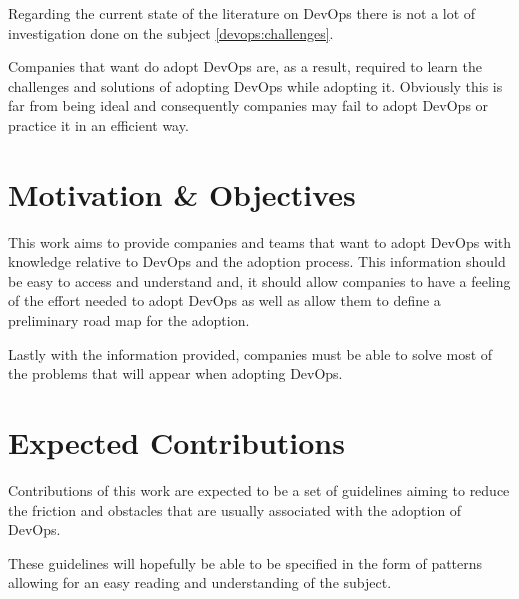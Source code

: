 		Regarding the current state of the literature on DevOps there is not a lot of investigation done on the subject \ref{devops:challenges}. 

		Companies that want do adopt DevOps are, as a result, required to learn the challenges and solutions of adopting DevOps while adopting it. Obviously this is far from being ideal and consequently companies may fail to adopt DevOps or practice it in an efficient way.

		   
	\section{Motivation \& Objectives} \label{chap:introduction:sec:motivation}

	    This work aims to provide companies and teams that want to adopt DevOps with knowledge relative to DevOps and the adoption process. This information should be easy to access and understand and, it should allow companies to have a feeling of the effort needed to adopt DevOps as well as allow them to define a preliminary road map for the adoption. 
	    
	    Lastly with the information provided, companies must be able to solve most of the problems that will appear when adopting DevOps.

    \section{Expected Contributions}
        
        Contributions of this work are expected to be a set of guidelines aiming to reduce the friction and obstacles that are usually associated with the adoption of DevOps.
        
        These guidelines will hopefully be able to be specified in the form of patterns allowing for an easy reading and understanding of the subject. 